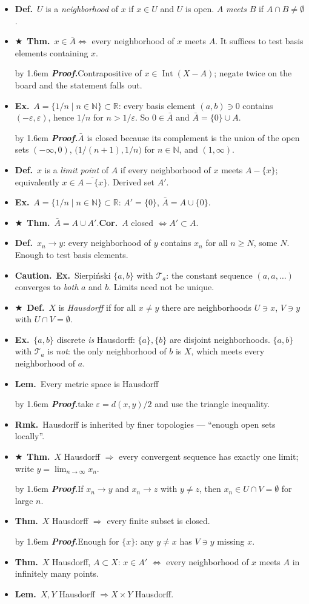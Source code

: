 \documentclass[12pt,a4paper]{article}
\newcommand{\Dfn}{\textbf{Def.}~}
\newcommand{\Thm}{\textbf{Thm.}~}
\newcommand{\Lem}{\textbf{Lem.}~}
\newcommand{\Cor}{\textbf{Cor.}~}
\newcommand{\Exa}{\textbf{Ex.}~}
\newcommand{\Rmk}{\textbf{Rmk.}~}
\newcommand{\Warn}{\textbf{Caution.}~}
\newcommand{\Key}{$\bigstar$~}                  %
\newcommand{\Pf}[1]{%
  \par\addvspace{7pt}\nopagebreak
  \begingroup
    \advance\leftskip by 1.6em
    \parindent=0pt \small\color{prf}%
    \textbf{\textit{Proof.}}\enspace #1\par
  \endgroup
  \addvspace{9pt}}
\newenvironment{BL}%
  {\begin{itemize}[leftmargin=1.4em,labelsep=0.55em,itemsep=11pt,topsep=11pt,parsep=0pt]}%
  {\end{itemize}}
\newcommand{\RR}{\mathbb{R}}
\newcommand{\NN}{\mathbb{N}}
\newcommand{\QQ}{\mathbb{Q}}
\newcommand{\cT}{\mathcal{T}}
\DeclareMathOperator{\Int}{Int}
\renewcommand{\iff}{\Leftrightarrow}
\newcommand{\imp}{\Rightarrow}
\begin{document}
\begin{BL}
      closure in $\QQ$ is $A$ itself. So $A$ is closed in $\QQ$.
\item \Dfn $U$ is a \emph{neighborhood} of $x$ if $x\in U$ and $U$ is open.
      $A$ \emph{meets} $B$ if $A\cap B\neq\emptyset$.
\item \Key\Thm $x\in\bar A\iff$ every neighborhood of $x$ meets $A$.
      It suffices to test basis elements containing $x$.
\Pf{Contrapositive of $x\in\Int(X-A)$; negate twice on the board and the statement falls out.}
\item \Exa $A=\{1/n\mid n\in\NN\}\subset\RR$: every basis element $(a,b)\ni0$ contains
      $(-\varepsilon,\varepsilon)$, hence $1/n$ for $n>1/\varepsilon$. So $0\in\bar A$ and
      $\bar A=\{0\}\cup A$.
\Pf{$\bar A$ is closed because its complement is the union of the open sets $(-\infty,0)$,
$\bigl(1/(n+1),1/n\bigr)$ for $n\in\NN$, and $(1,\infty)$.}
\item \Dfn $x$ is a \emph{limit point} of $A$ if every neighborhood of $x$ meets $A-\{x\}$;
      equivalently $x\in\overline{A-\{x\}}$. Derived set $A'$.
\item \Exa $A=\{1/n\mid n\in\NN\}\subset\RR$: $A'=\{0\}$, $\bar A=A\cup\{0\}$.
\item \Key\Thm $\bar A=A\cup A'$.\quad \Cor $A$ closed $\iff A'\subset A$.
\item \Dfn $x_n\to y$: every neighborhood of $y$ contains $x_n$ for all $n\ge N$, some $N$.
      Enough to test basis elements.
\item \Warn \Exa Sierpi\'nski $\{a,b\}$ with $\cT_a$: the constant sequence $(a,a,\dots)$
      converges to \emph{both} $a$ and $b$. Limits need not be unique.
\item \Key\Dfn $X$ is \emph{Hausdorff} if for all $x\neq y$ there are neighborhoods
      $U\ni x$, $V\ni y$ with $U\cap V=\emptyset$.
\item \Exa $\{a,b\}$ discrete \emph{is} Hausdorff: $\{a\},\{b\}$ are disjoint neighborhoods.
      $\{a,b\}$ with $\cT_a$ is \emph{not}: the only neighborhood of $b$ is $X$, which meets
      every neighborhood of $a$.
\item \Lem Every metric space is Hausdorff \Pf{take $\varepsilon=d(x,y)/2$ and use the triangle
inequality.}
\item \Rmk Hausdorff is inherited by finer topologies --- ``enough open sets locally''.
\item \Key\Thm $X$ Hausdorff $\imp$ every convergent sequence has exactly one limit; write
      $y=\lim_{n\to\infty}x_n$.
\Pf{If $x_n\to y$ and $x_n\to z$ with $y\neq z$, then $x_n\in U\cap V=\emptyset$ for large $n$.}
\item \Thm $X$ Hausdorff $\imp$ every finite subset is closed.
      \Pf{Enough for $\{x\}$: any $y\neq x$ has $V\ni y$ missing $x$.}
\item \Thm $X$ Hausdorff, $A\subset X$: $x\in A'$ $\iff$ every neighborhood of $x$ meets $A$
      in infinitely many points.
\item \Lem $X,Y$ Hausdorff $\imp X\times Y$ Hausdorff.
\end{BL}
\end{document}
